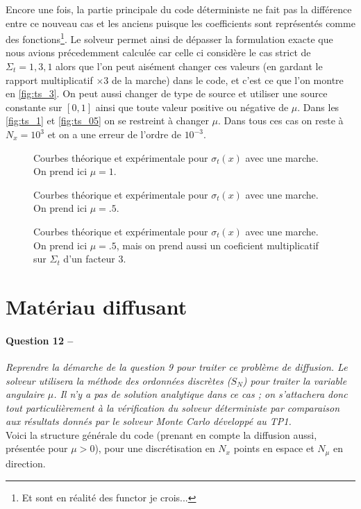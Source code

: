 \documentclass[11pt,a4paper]{article}
\newcommand{\question}[2]{\paragraph{Question #1 --}\hspace{-7pt}\textit{#2} \\}
\begin{document}
Encore une fois, la partie principale du code déterministe ne fait pas la différence entre ce nouveau cas et les anciens puisque les coefficients sont représentés comme des fonctions\footnote{Et sont en réalité des functor je crois...}. Le solveur permet ainsi de dépasser la formulation exacte que nous avions précedemment calculée car celle ci considère le cas strict de $\Sigma_t=1, 3, 1$ alors que l'on peut aisément changer ces valeurs (en gardant le rapport multiplicatif $\times3$ de la marche) dans le code, et c'est ce que l'on montre en \autoref{fig:ts_3}. On peut aussi changer de type de source et utiliser une source constante sur $[0,1]$ ainsi que toute valeur positive ou négative de $\mu$. Dans les \autoref{fig:ts_1} et \autoref{fig:ts_05} on se restreint à changer $\mu$. Dans tous ces cas on reste à $N_x=10^3$ et on a une erreur de l'ordre de $10^{-3}$.
\begin{figure}
  \centering
  
  \caption{Courbes théorique et expérimentale pour $\sigma_t(x)$ avec une marche. On prend ici $\mu=1$. }
  \label{fig:ts_1}
\end{figure}
\begin{figure}
  \centering
  
  \caption{Courbes théorique et expérimentale pour $\sigma_t(x)$ avec une marche. On prend ici $\mu=.5$. }
  \label{fig:ts_05}
\end{figure}
\begin{figure}
  \centering
  
  \caption{Courbes théorique et expérimentale pour $\sigma_t(x)$ avec une marche. On prend ici $\mu=.5$, mais on prend aussi un coeficient multiplicatif sur $\Sigma_t$ d'un facteur $3$. }
  \label{fig:ts_3}
\end{figure}


\section{Matériau diffusant}

\question{12}{Reprendre la démarche de la question 9 pour traiter ce problème de diffusion.
Le solveur utilisera la méthode des ordonnées discrètes ($S_N$) pour traiter la variable angulaire $\mu$.
Il n'y a pas de solution analytique dans ce cas ; on s'attachera donc tout particulièrement à la vérification du solveur déterministe par comparaison aux résultats donnés par le solveur Monte Carlo développé au TP1.}

Voici la structure générale du code (prenant en compte la diffusion aussi, présentée pour $\mu>0$), pour une discrétisation en $N_x$ points en espace et $N_{\mu}$ en direction.
\end{document}
